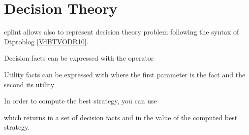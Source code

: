 \documentclass[letterpaper,10pt,english]{sphinxmanual}
\begin{document}
\section{Decision Theory}
\label{\detokenize{index:decision-theory}}
\sphinxAtStartPar
cplint allows also to represent decision theory problem following the syntax of Dtproblog {[}\hyperlink{cite.index:id68}{VdBTVODR10}{]}.

\sphinxAtStartPar
Decision facts can be expressed with the operator 

\begin{sphinxVerbatim}[commandchars=\\\{\}]
  
\end{sphinxVerbatim}

\sphinxAtStartPar
Utility facts can be expressed with  where the first parameter is the fact and the second its utility

\begin{sphinxVerbatim}[commandchars=\\\{\}]
\end{sphinxVerbatim}

\sphinxAtStartPar
In order to compute the best strategy, you can use 

\begin{sphinxVerbatim}[commandchars=\\\{\}]
\end{sphinxVerbatim}

\sphinxAtStartPar
which returns in  a set of decision facts and in  the value of the computed best strategy.
\end{document}
